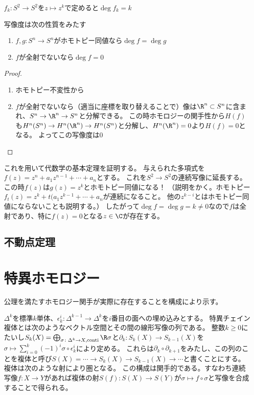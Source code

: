 \documentclass{jsarticle}
\begin{document}
\begin{eg}
$f_k:S^2\to S^2$を$z\mapsto z^k$で定めると$\deg f_k=k$
\end{eg}

\begin{prop}
写像度は次の性質をみたす
\begin{enumerate}
\item $f, g:S^n\to S^n$がホモトピー同値なら$\deg f=\deg g$
\item $f$が全射でないなら$\deg f=0$
\end{enumerate}
\end{prop}
\begin{proof}
\begin{enumerate}
\item ホモトピー不変性から
\item $f$が全射でないなら（適当に座標を取り替えることで）像は$\R^n\subset S^n$に含まれ、$S^n\to\R^n\to S^n$と分解できる。
この時ホモロジーの関手性から$H(f)$も$H^n(S^n)\to H^n(\R^n)\to H^n(S^n)$と分解し、$H^n(\R^n)=0$より$H(f)=0$となる。
よってこの写像度は$0$
\end{enumerate}
\end{proof}

これを用いて代数学の基本定理を証明する。
与えられた多項式を$f(z)=z^n+a_1z^{n-1}+\cdots+a_n$とする。
これを$S^2\to S^2$の連続写像に延長する。
この時$f(z)$は$g(z)=z^k$とホモトピー同値になる！
（説明をかく。ホモトピー$f_t(z)=z^k+t(a_1z^{k-1}+\cdots+a_n$が連続になること。
他の$z^{k-i}$とはホモトピー同値にならないことも説明する。）
したがって$\deg f=\deg g=k\neq0$なので$f$は全射であり、特に$f(z)=0$となる$z\in\C$が存在する。
\subsection{不動点定理}

\section{特異ホモロジー}
公理を満たすホモロジー関手が実際に存在することを構成により示す。

$\Delta^k$を標準$k$単体、$\epsilon^i_k\colon\Delta^{k-1}\to\Delta^k$を$i$番目の面への埋め込みとする。
特異チェイン複体とは次のようなベクトル空間とその間の線形写像の列である。
整数$k\geq0$にたいし$S_k(X)=\bigoplus_{\sigma\colon\Delta^k\to X, \text{conti}}\R\sigma$と$\partial_k\colon S_k(X)\to S_{k-1}(X)$を$\sigma\mapsto\sum_{i=0}^k(-1)^i\sigma\circ\epsilon_k^i$により定める。
これらは$\partial_k\circ\partial_{k+1}$をみたし、この列のことを複体と呼び$S(X)=\cdots\to S_k(X)\to S_{k-1}(X)\to\cdots$と書くことにする。
複体は次のような射により圏となる。
この構成は関手的である。すなわち連続写像$f\colon X\to Y$があれば複体の射$S(f)\colon S(X)\to S(Y)$が$\sigma\mapsto f\circ\sigma$と写像を合成することで得られる。 
\end{document}
